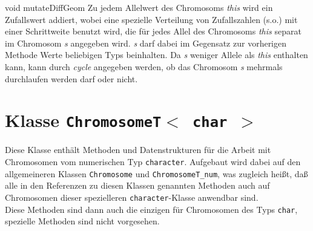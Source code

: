 \documentclass{report}
\begin{document}
\setNormalInstance
\setCorrectWidthThree{8pt}
\printMethodWithParamsSaved
{void}
{}
{mutateDiffGeom}
{Zu jedem Allelwert des Chromosoms {\em this} wird ein Zufallswert addiert, wobei
    eine spezielle Verteilung von Zufallszahlen (s.o.) mit einer
    Schrittweite benutzt wird, die f\"ur jedes Allel des Chromosoms {\em this}
    separat im Chromosom {\em s} angegeben wird. {\em s} darf dabei im Gegensatz
    zur vorherigen Methode Werte beliebigen Typs beinhalten.
    Da {\em s} weniger Allele als {\em this} enthalten kann, kann durch {\em cycle} angegeben 
    werden, ob das Chromosom {\em s} mehrmals durchlaufen werden darf oder nicht.}
{}
\setCorrectWidthThree{4pt}

\newpage

\setNormalInstance

\noindent
\chapter{Klasse {\tt ChromosomeT$<$ char $>$}}
Diese Klasse enth\"alt Methoden und Datenstrukturen f\"ur die Arbeit
mit Chromosomen vom numerischen Typ {\tt character}.
Aufgebaut wird dabei auf den allgemeineren Klassen {\tt Chromosome} und
{\tt ChromosomeT\_num},
was zugleich hei{\ss}t, da{\ss} alle in den Referenzen zu diesen Klassen
genannten Methoden auch auf Chromosomen dieser spezielleren
{\tt character}-Klasse anwendbar sind.\\
Diese Methoden sind dann auch die einzigen f\"ur Chromosomen des
Typs {\tt char}, spezielle Methoden sind nicht vorgesehen.
\end{document}

